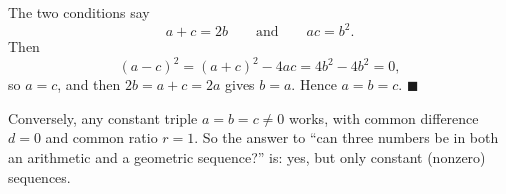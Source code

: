 The two conditions say
\[
a+c=2b\qquad\text{and}\qquad ac=b^2 .
\]
Then
\[
(a-c)^2=(a+c)^2-4ac=4b^2-4b^2=0 ,
\]
so $a=c$, and then $2b=a+c=2a$ gives $b=a$. Hence $a=b=c$. $\blacksquare$

Conversely, any constant triple $a=b=c\ne0$ works, with common difference $d=0$ and common ratio $r=1$. So the answer to ``can three numbers be in both an arithmetic and a geometric sequence?'' is: yes, but only constant (nonzero) sequences.
